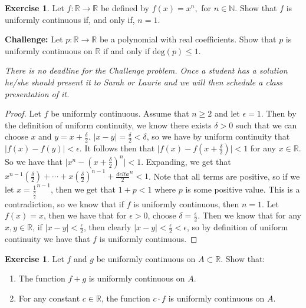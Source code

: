 \documentclass[12pt]{article}
\newcommand{\bbN}{\mathbb{N}}
\newcommand{\bbR}{\mathbb{R}}
\providecommand{\abs}[1]{\lvert #1 \rvert}
\renewcommand{\_}[1]{\underline{ #1 }}
\theoremstyle{definition}
\newtheorem{exercise}[theorem]{Exercise}
\numberwithin{equation}{subsection}
\begin{document}
\begin{exercise}
Let $f:\bbR\longrightarrow \bbR$ be defined by $f(x)=x^n,$ for $n\in\bbN.$ Show that $f$ is uniformly continuous if, and only if, $n=1.$ 

{\bf Challenge:} Let $p:\bbR\rightarrow\bbR$ be a polynomial with real coefficients.  Show that $p$ is uniformly
continuous on $\bbR$ if and only if $\mbox{deg}(p)\leq 1$.

{\it There is no deadline for the Challenge problem. Once a student has a solution he/she should present it to Sarah or Laurie
and we will then schedule a class presentation of it.}

\end{exercise}
\begin{proof}
Let $f$ be uniformly continuous. Assume that $n \geq 2$ and let $\epsilon = 1$. Then by the definition of uniform continuity, we know there exists $\delta > 0$ such that we can choose $x$ and $y = x + \frac{\delta}{2}$. $\abs{x - y} = \frac{\delta}{2} < \delta$, so we have by uniform continuity that $\abs{f(x) - f(y)} < \epsilon$. It follows then that $\abs{f(x) - f(x + \frac{\delta}{2})} < 1$ for any $x \in \bbR$. So we have that $\abs{x^n - (x + \frac{\delta}{2})^n} < 1$. Expanding, we get that $x^{n-1}(\frac{\delta}{2}) + \dotsm + x(\frac{\delta}{2})^{n-1} + {\frac{delta}{2}}^n < 1$. Note that all terms are positive, so if we let $x = \frac{1}{\frac{\delta}{2}}^{n-1}$, then we get that $1 + p < 1$ where $p$ is some positive value. This is a contradiction, so we know that if $f$ is uniformly continuous, then $n = 1$. \newline
Let $f(x) = x$, then we have that for $\epsilon > 0$, choose $\delta = \frac{\epsilon}{2}$. Then we know that for any $x,y \in \bbR$, if $\abs{x - y} < \frac{\epsilon}{2}$, then clearly $\abs{x - y} < \frac{\epsilon}{2} < \epsilon$, so by definition of uniform continuity we have that $f$ is uniformly continuous. 
\end{proof}

\begin{exercise}
Let $f$ and $g$ be uniformly continuous on $A\subset \bbR$.  Show that:
\begin{enumerate}
\item  The function $f+g$ is uniformly continuous on $A$.

\item  For any constant $c\in \bbR$, the function $c\cdot f$ is uniformly continuous on $A$.

\end{enumerate}
\end{exercise}
\end{document}
